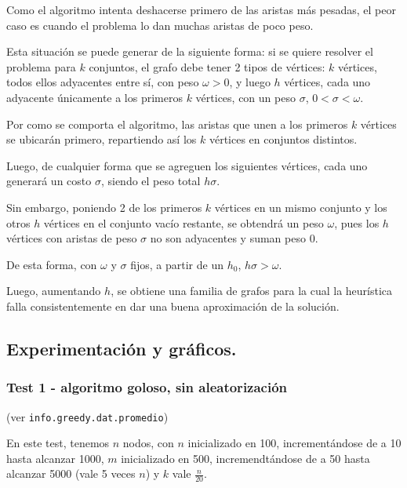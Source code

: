 Como el algoritmo intenta deshacerse primero de las aristas más pesadas, el
peor caso es cuando el problema lo dan muchas aristas de poco peso.

\vspace*{0.3cm}

Esta situación se puede generar de la siguiente forma: si se quiere
resolver el problema para $k$ conjuntos, el grafo debe tener 2 tipos de
vértices: $k$ vértices, todos ellos adyacentes entre sí, con peso
$\omega > 0$, y luego $h$ vértices, cada uno adyacente únicamente a los
primeros $k$ vértices, con un peso $\sigma$, $0 < \sigma < \omega$.

Por como se comporta el algoritmo, las aristas que unen a los primeros $k$
vértices se ubicarán primero, repartiendo
así los $k$ vértices en conjuntos distintos.

Luego, de cualquier forma que se agreguen los siguientes vértices,
cada uno generará un costo $\sigma$, siendo el peso total $h \sigma$.

Sin embargo, poniendo 2 de los primeros $k$ vértices en un mismo conjunto
y los otros $h$ vértices en el conjunto vacío restante, se obtendrá un peso
$\omega$, pues los $h$ vértices con aristas de peso
$\sigma$ no son adyacentes y suman peso $0$.

De esta forma, con $\omega$ y
$\sigma$ fijos, a partir de un $h_0$, $h \sigma > \omega$.

\vspace*{0.3cm}

Luego, aumentando $h$, se obtiene una familia de grafos para la cual
la heurística falla consistentemente en dar una buena aproximación de la solución.


\newpage \subsection{Experimentación y gráficos.}
\vspace*{0.3cm}

\vspace*{0.3cm}

\subsubsection{Test 1 - algoritmo goloso, sin aleatorización}

(ver \verb|info.greedy.dat.promedio|) \medskip

En este test, tenemos $n$ nodos, con $n$ inicializado en 100, incrementándose de a 10 hasta alcanzar 1000, $m$ inicializado en 500, incremendtándose de a 50 hasta alcanzar 5000 (vale 5 veces $n$) y $k$ vale $\frac{n}{20}$.


